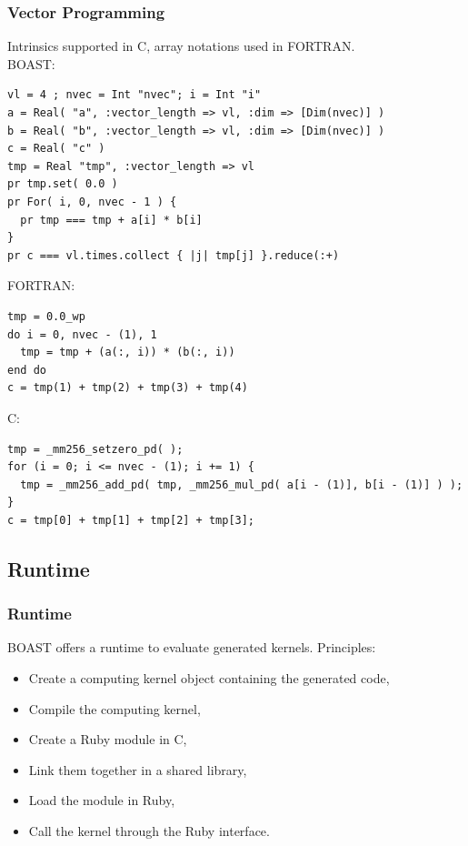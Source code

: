 \documentclass{beamer}
\begin{document}
\begin{frame}[fragile]
\frametitle{Vector Programming}
Intrinsics supported in C, array notations used in FORTRAN.\\
BOAST:
\lstset{style=BOAST}
\begin{lstlisting}
vl = 4 ; nvec = Int "nvec"; i = Int "i"
a = Real( "a", :vector_length => vl, :dim => [Dim(nvec)] )
b = Real( "b", :vector_length => vl, :dim => [Dim(nvec)] )
c = Real( "c" )
tmp = Real "tmp", :vector_length => vl
pr tmp.set( 0.0 )
pr For( i, 0, nvec - 1 ) {
  pr tmp === tmp + a[i] * b[i]
}
pr c === vl.times.collect { |j| tmp[j] }.reduce(:+)
\end{lstlisting}
FORTRAN:
\lstset{style=BFortran}
\begin{lstlisting}
tmp = 0.0_wp
do i = 0, nvec - (1), 1
  tmp = tmp + (a(:, i)) * (b(:, i))
end do
c = tmp(1) + tmp(2) + tmp(3) + tmp(4)
\end{lstlisting}
C:
\lstset{style=BC}
\begin{lstlisting}
tmp = _mm256_setzero_pd( );
for (i = 0; i <= nvec - (1); i += 1) {
  tmp = _mm256_add_pd( tmp, _mm256_mul_pd( a[i - (1)], b[i - (1)] ) );
}
c = tmp[0] + tmp[1] + tmp[2] + tmp[3];
\end{lstlisting}
\end{frame}

\subsection{Runtime}

\begin{frame}
\frametitle{Runtime}
BOAST offers a runtime to evaluate generated kernels. Principles:
\begin{itemize}
\item Create a computing kernel object containing the generated code,
\item Compile the computing kernel,
\item Create a Ruby module in C,
\item Link them together in a shared library,
\item Load the module in Ruby,
\item Call the kernel through the Ruby interface.
\end{itemize}
\end{frame}
\end{document}
